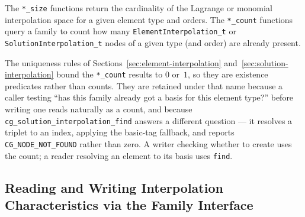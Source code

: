\documentclass[11pt,letterpaper]{article}
\newif\ifvfourdraft
\newcommand{\vfour}[1]{\ifvfourdraft\textcolor{v4violet}{#1}\else#1\fi}
\begin{document}
The \texttt{*\_size} functions return the cardinality of the Lagrange or monomial interpolation
space for a given element type and orders.  The \texttt{*\_count} functions query a family to
count how many \texttt{ElementInterpolation\_t} or \texttt{SolutionInterpolation\_t} nodes of a
given type (and order) are already present.

\vfour{The uniqueness rules of Sections~\ref{sec:element-interpolation}
and~\ref{sec:solution-interpolation} bound the \texttt{*\_count} results to $0$
or~$1$, so they are existence predicates rather than counts.  They are retained
under that name because a caller testing ``has this family already got a basis
for this element type?'' before writing one reads naturally as a count, and
because \texttt{cg\_solution\_interpolation\_find} answers a different question ---
it resolves a triplet to an index, applying the basic-tag fallback, and reports
\texttt{CG\_NODE\_NOT\_FOUND} rather than zero.  A writer checking whether to
create uses the count; a reader resolving an element to its basis uses
\texttt{find}.}

\subsection{Reading and Writing Interpolation Characteristics via the Family Interface}
\label{sec:family-api}
\end{document}
